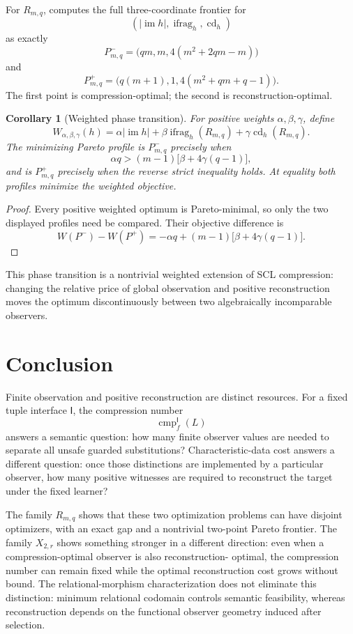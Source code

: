 \documentclass[11pt]{article}
\newtheorem{corollary}[theorem]{Corollary}
\theoremstyle{definition}
\theoremstyle{remark}
\newcommand{\im}{\operatorname{im}}
\newcommand{\cmp}{\operatorname{cmp}}
\newcommand{\cd}{\operatorname{cd}}
\newcommand{\ifrag}{\operatorname{ifrag}}
\begin{document}
For $R_{m,q}$, \cite{KuriyamaOFET} computes the full three-coordinate frontier
for
\[
 (|\im h|,\ifrag_h,\cd_h)
\]
as exactly
\[
 P^-_{m,q}
 =
 \bigl(qm,m,4(m^2+2qm-m)\bigr)
\]
and
\[
 P^+_{m,q}
 =
 \bigl(q(m+1),1,4(m^2+qm+q-1)\bigr).
\]
The first point is compression-optimal; the second is reconstruction-optimal.

\begin{corollary}[Weighted phase transition]
\label{cor:weighted}
For positive weights $\alpha,\beta,\gamma$, define
\[
 W_{\alpha,\beta,\gamma}(h)
 =
 \alpha|\im h|
 +\beta\ifrag_h(R_{m,q})
 +\gamma\cd_h(R_{m,q}).
\]
The minimizing Pareto profile is $P^-_{m,q}$ precisely when
\[
 \alpha q>
 (m-1)\bigl[\beta+4\gamma(q-1)\bigr],
\]
and is $P^+_{m,q}$ precisely when the reverse strict inequality holds.  At
equality both profiles minimize the weighted objective.
\end{corollary}

\begin{proof}
Every positive weighted optimum is Pareto-minimal, so only the two displayed
profiles need be compared.  Their objective difference is
\[
 W(P^-)-W(P^+)
 =
 -\alpha q
 +(m-1)\bigl[\beta+4\gamma(q-1)\bigr].
\]
\end{proof}

This phase transition is a nontrivial weighted extension of SCL compression:
changing the relative price of global observation and positive reconstruction
moves the optimum discontinuously between two algebraically incomparable
observers.

\section{Conclusion}

Finite observation and positive reconstruction are distinct resources.  For
a fixed tuple interface $\mathsf I$, the compression number
\[
 \cmp_f^{\mathsf I}(L)
\]
answers a semantic question: how many finite observer values are needed to
separate all unsafe guarded substitutions?  Characteristic-data cost answers a
different question: once those distinctions are implemented by a particular
observer, how many positive witnesses are required to reconstruct the target
under the fixed learner?

The family $R_{m,q}$ shows that these two optimization problems can have
disjoint optimizers, with an exact gap and a nontrivial two-point Pareto
frontier.  The family $X_{2,r}$ shows something stronger in a different
direction: even when a compression-optimal observer is also reconstruction-
optimal, the compression number can remain fixed while the optimal
reconstruction cost grows without bound.  The relational-morphism
characterization does not eliminate this distinction: minimum relational
codomain controls semantic feasibility, whereas reconstruction depends on the
functional observer geometry induced after selection.
\end{document}
